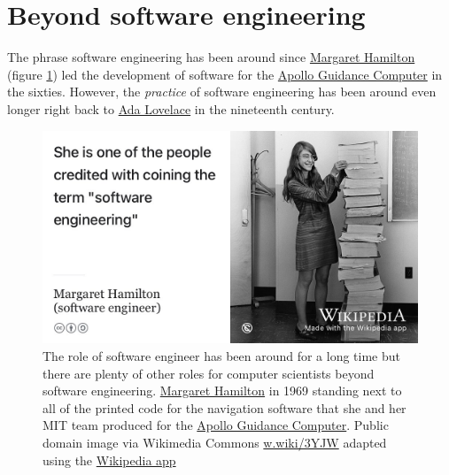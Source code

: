 \documentclass[
]{book}
\begin{document}
\hypertarget{otheroles}{%
\section{Beyond software engineering}\label{otheroles}}

The phrase software engineering has been around since \href{https://en.wikipedia.org/wiki/Margaret_Hamilton_(software_engineer)}{Margaret Hamilton} (figure \ref{fig:hamilton-fig}) led the development of software for the \href{https://en.wikipedia.org/wiki/Apollo_Guidance_Computer}{Apollo Guidance Computer} in the sixties. However, the \emph{practice} of software engineering has been around even longer right back to \href{https://en.wikipedia.org/wiki/Ada_Lovelace}{Ada Lovelace} in the nineteenth century.

\begin{figure}

{\centering \includegraphics[width=1\linewidth]{images/margaret-hamilton} 

}

\caption{The role of software engineer has been around for a long time but there are plenty of other roles for computer scientists beyond software engineering. \href{https://en.wikipedia.org/wiki/Margaret_Hamilton_(software_engineer)}{Margaret Hamilton} in 1969 standing next to all of the printed code for the navigation software that she and her MIT team produced for the \href{https://en.wikipedia.org/wiki/Apollo_Guidance_Computer}{Apollo Guidance Computer}. Public domain image via Wikimedia Commons \href{https://w.wiki/3YJW}{w.wiki/3YJW} adapted using the \href{https://apps.apple.com/us/app/wikipedia/id324715238}{Wikipedia app}}\label{fig:hamilton-fig}
\end{figure}
\end{document}

